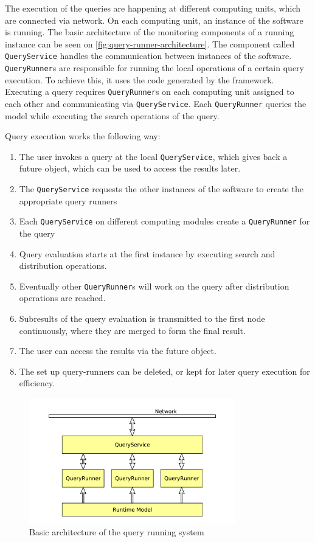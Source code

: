 The execution of the queries are happening at different computing units, which are connected via network.
On each computing unit, an instance of the software is running.
The basic architecture of the monitoring components of a running instance can be seen on \autoref{fig:query-runner-architecture}.
The component called \texttt{QueryService} handles the communication between instances of the software.
\texttt{QueryRunner}s are responsible for running the local operations of a certain query execution. 
To achieve this, it uses the code generated by the framework.
Executing a query requires \texttt{QueryRunner}s on each computing unit assigned to each other and communicating via \texttt{QueryService}. 
Each \texttt{QueryRunner} queries the model while executing the search operations of the query.

Query execution works the following way:
\begin{enumerate}
\item The user invokes a query at the local \texttt{QueryService}, which gives back a future object, which can be used to access the results later.
\item The \texttt{QueryService} requests the other instances of the software to create the appropriate query runners
\item Each \texttt{QueryService} on different computing modules create a \texttt{QueryRunner} for the query
\item Query evaluation starts at the first instance by executing search and distribution operations.
\item Eventually other \texttt{QueryRunner}s will work on the query after distribution operations are reached.
\item Subresults of the query evaluation is transmitted to the first node continuously, where they are merged to form the final result.
\item The user can access the results via the future object.
\item The set up query-runners can be deleted, or kept for later query execution for efficiency.
\end{enumerate}


\begin{figure}[H]
	\begin{center}
		\includegraphics[width=0.8\textwidth]{figures/query-runner-architecture.pdf}
		\caption{ Basic architecture of the query running system }
		\label{fig:query-runner-architecture}
	\end{center}
\end{figure}









